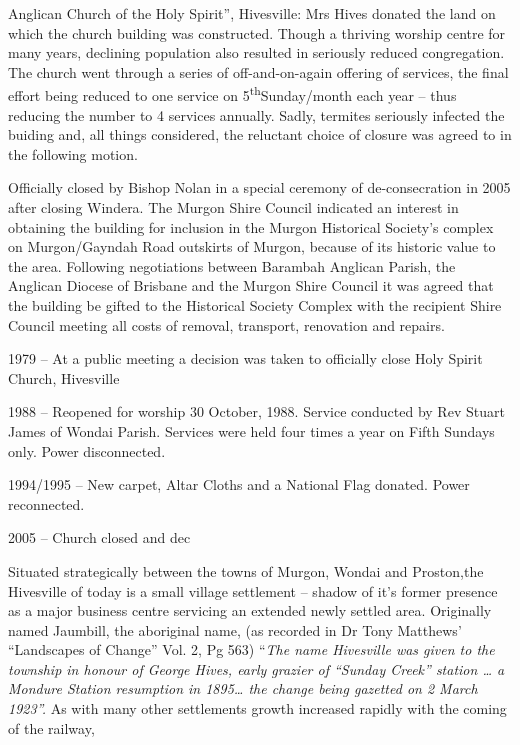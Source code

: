 Anglican Church of the Holy Spirit'', Hivesville: Mrs Hives donated the land on which the church building was constructed. Though a thriving worship centre for many years, declining population also resulted in seriously reduced congregation. The church went through a series of off-and-on-again offering of services, the final effort being reduced to one service on 5\textsuperscript{th}Sunday/month each year -- thus reducing the number to 4 services annually. Sadly, termites seriously infected the buiding and, all things considered, the reluctant choice of closure was agreed to in the following motion.



Officially closed by Bishop Nolan in a special ceremony of de-consecration in 2005 after closing Windera. The Murgon Shire Council indicated an interest in obtaining the building for inclusion in the Murgon Historical Society's complex on Murgon/Gayndah Road outskirts of Murgon, because of its historic value to the area. Following negotiations between Barambah Anglican Parish, the Anglican Diocese of Brisbane and the Murgon Shire Council it was agreed that the building be gifted to the Historical Society Complex with the recipient Shire Council meeting all costs of removal, transport, renovation and repairs.



1979 -- At a public meeting a decision was taken to officially close Holy Spirit Church, Hivesville



1988 -- Reopened for worship 30 October, 1988. Service conducted by Rev Stuart James of Wondai Parish. Services were held four times a year on Fifth Sundays only. Power disconnected.



1994/1995 -- New carpet, Altar Cloths and a National Flag donated. Power reconnected.



2005 -- Church closed and dec



Situated strategically between the towns of Murgon, Wondai and Proston,the Hivesville of today is a small village settlement -- shadow of it's former presence as a major business centre servicing an extended newly settled area. Originally named Jaumbill, the aboriginal name, (as recorded in Dr Tony Matthews' ``Landscapes of Change'' Vol. 2, Pg 563) ``\emph{The name Hivesville was given to the township in honour of George Hives, early grazier of ``Sunday Creek'' station \ldots{} a Mondure Station resumption in 1895\ldots{} the change being gazetted on 2 March 1923''.} As with many other settlements growth increased rapidly with the coming of the railway,



